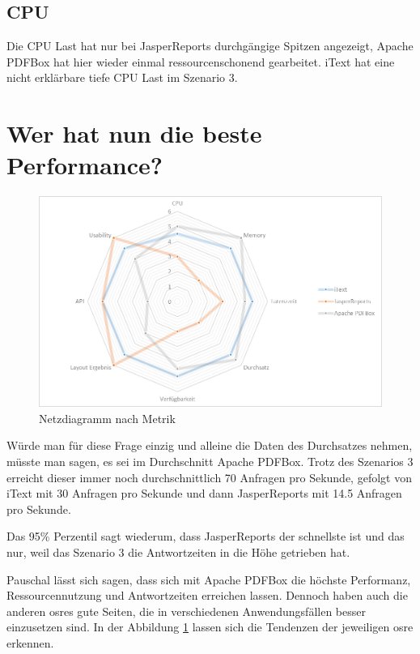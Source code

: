 \documentclass[main.tex]{subfiles}
\begin{document}
\subsection{CPU}
Die CPU Last hat nur bei JasperReports durchgängige Spitzen angezeigt, Apache PDFBox hat hier wieder einmal ressourcenschonend gearbeitet. iText hat eine nicht erklärbare tiefe CPU Last im Szenario 3.


\section{Wer hat nun die beste Performance?}

\begin{figure}[!hb]
\includegraphics[width=\textwidth]{end/5_erfarhungsbericht/Netzdiagramm.png}
 \caption{Netzdiagramm nach Metrik}
 \label{figure:netzdiagrammMetriken}
\end{figure}

Würde man für diese Frage einzig und alleine die Daten des Durchsatzes nehmen, müsste man sagen, es sei im Durchschnitt Apache PDFBox. Trotz des Szenarios 3 erreicht dieser immer noch durchschnittlich 70 Anfragen pro Sekunde, gefolgt von iText mit 30 Anfragen pro Sekunde und dann JasperReports mit 14.5 Anfragen pro Sekunde.

Das 95\% Perzentil sagt wiederum, dass JasperReports der schnellste ist und das nur, weil das Szenario 3 die Antwortzeiten in die Höhe getrieben hat.

Pauschal lässt sich sagen, dass sich mit Apache PDFBox die höchste Performanz, Ressourcennutzung und Antwortzeiten erreichen lassen. Dennoch haben auch die anderen \acrshort{osre}s gute Seiten, die in verschiedenen Anwendungsfällen besser einzusetzen sind. In der Abbildung \ref{figure:netzdiagrammMetriken} lassen sich die Tendenzen der jeweiligen \acrshort{osre} erkennen.
\end{document}
